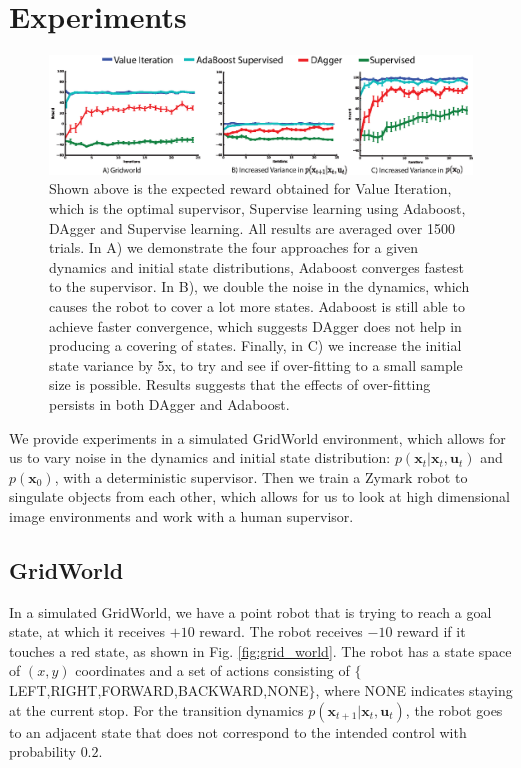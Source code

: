 \documentclass[10pt, conference]{ieeeconf}      %
\newcommand{\bu}{\mathbf{u}}
\newcommand{\bx}{\mathbf{x}}
\begin{document}
\section{Experiments}


\begin{figure}
\includegraphics{f_figs/var_grid.eps}
\caption{
    \footnotesize
Shown above is the expected reward obtained for Value Iteration, which is the optimal supervisor, Supervise learning using Adaboost, DAgger and Supervise learning. All results are averaged over 1500 trials. In A) we demonstrate the four approaches for a given dynamics and initial state distributions, Adaboost converges fastest to the supervisor. In B), we double the noise in the dynamics, which causes the robot to cover a lot more states. Adaboost is still able to achieve faster convergence, which suggests DAgger does not help in producing a covering of states. Finally, in C) we increase the initial state variance by 5x, to try and see if over-fitting to a small sample size is possible. Results suggests that the effects of over-fitting persists in both DAgger and Adaboost.}
\vspace*{-20pt}
\label{fig:var}
\end{figure}

We provide experiments in a simulated GridWorld environment, which allows for us to vary noise in the dynamics and initial state distribution: $p(\bx_t|\bx_t,\bu_t)$ and $p(\bx_0)$, with a deterministic supervisor. Then we  train a Zymark robot to singulate objects from each other, which allows for us to look at high dimensional image environments and work with a human supervisor. 
\subsection{GridWorld}\label{sec:gdw}
In a simulated GridWorld, we have a point robot that is trying to reach a goal state, at which it receives $+10$ reward. The robot receives $-10$ reward if it touches a red state, as shown in Fig. \ref{fig:grid_world}. The robot has a state space of $(x,y)$ coordinates and a set of actions consisting of $\lbrace$LEFT,RIGHT,FORWARD,BACKWARD,NONE$\rbrace$, where NONE indicates staying at the current stop. For the transition dynamics $p(\bx_{t+1}|\bx_{t},\bu_t)$, the robot goes to an adjacent state that does not correspond to the intended control with probability $0.2$. 
\end{document}
